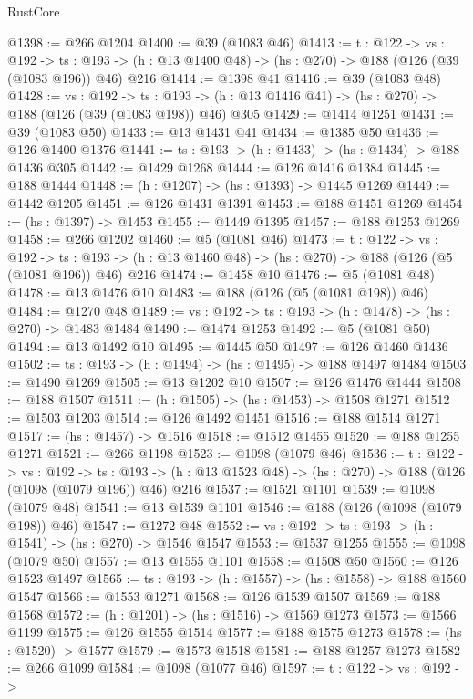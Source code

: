 \begin{lexlean}{RustCore}
\begin{coremodule}
@1398 := @266 @1204
@1400 := @39 (@1083 @46)
@1413 := {t : @122} ->
  {vs : @192} ->
  {ts : @193} -> (h : @13 @1400 @48) -> (hs : @270) -> @188 (@126 (@39 (@1083 @196)) @46) @216
@1414 := @1398 @41
@1416 := @39 (@1083 @48)
@1428 := {vs : @192} ->
  {ts : @193} -> (h : @13 @1416 @41) -> (hs : @270) -> @188 (@126 (@39 (@1083 @198)) @46) @305
@1429 := @1414 @1251
@1431 := @39 (@1083 @50)
@1433 := @13 @1431 @41
@1434 := @1385 @50
@1436 := @126 @1400 @1376
@1441 := {ts : @193} -> (h : @1433) -> (hs : @1434) -> @188 @1436 @305
@1442 := @1429 @1268
@1444 := @126 @1416 @1384
@1445 := @188 @1444
@1448 := (h : @1207) -> (hs : @1393) -> @1445 @1269
@1449 := @1442 @1205
@1451 := @126 @1431 @1391
@1453 := @188 @1451 @1269
@1454 := (hs : @1397) -> @1453
@1455 := @1449 @1395
@1457 := @188 @1253 @1269
@1458 := @266 @1202
@1460 := @5 (@1081 @46)
@1473 := {t : @122} ->
  {vs : @192} ->
  {ts : @193} -> (h : @13 @1460 @48) -> (hs : @270) -> @188 (@126 (@5 (@1081 @196)) @46) @216
@1474 := @1458 @10
@1476 := @5 (@1081 @48)
@1478 := @13 @1476 @10
@1483 := @188 (@126 (@5 (@1081 @198)) @46)
@1484 := @1270 @48
@1489 := {vs : @192} -> {ts : @193} -> (h : @1478) -> (hs : @270) -> @1483 @1484
@1490 := @1474 @1253
@1492 := @5 (@1081 @50)
@1494 := @13 @1492 @10
@1495 := @1445 @50
@1497 := @126 @1460 @1436
@1502 := {ts : @193} -> (h : @1494) -> (hs : @1495) -> @188 @1497 @1484
@1503 := @1490 @1269
@1505 := @13 @1202 @10
@1507 := @126 @1476 @1444
@1508 := @188 @1507
@1511 := (h : @1505) -> (hs : @1453) -> @1508 @1271
@1512 := @1503 @1203
@1514 := @126 @1492 @1451
@1516 := @188 @1514 @1271
@1517 := (hs : @1457) -> @1516
@1518 := @1512 @1455
@1520 := @188 @1255 @1271
@1521 := @266 @1198
@1523 := @1098 (@1079 @46)
@1536 := {t : @122} ->
  {vs : @192} ->
  {ts : @193} -> (h : @13 @1523 @48) -> (hs : @270) -> @188 (@126 (@1098 (@1079 @196)) @46) @216
@1537 := @1521 @1101
@1539 := @1098 (@1079 @48)
@1541 := @13 @1539 @1101
@1546 := @188 (@126 (@1098 (@1079 @198)) @46)
@1547 := @1272 @48
@1552 := {vs : @192} -> {ts : @193} -> (h : @1541) -> (hs : @270) -> @1546 @1547
@1553 := @1537 @1255
@1555 := @1098 (@1079 @50)
@1557 := @13 @1555 @1101
@1558 := @1508 @50
@1560 := @126 @1523 @1497
@1565 := {ts : @193} -> (h : @1557) -> (hs : @1558) -> @188 @1560 @1547
@1566 := @1553 @1271
@1568 := @126 @1539 @1507
@1569 := @188 @1568
@1572 := (h : @1201) -> (hs : @1516) -> @1569 @1273
@1573 := @1566 @1199
@1575 := @126 @1555 @1514
@1577 := @188 @1575 @1273
@1578 := (hs : @1520) -> @1577
@1579 := @1573 @1518
@1581 := @188 @1257 @1273
@1582 := @266 @1099
@1584 := @1098 (@1077 @46)
@1597 := {t : @122} ->
  {vs : @192} ->

\end{coremodule}
\end{lexlean}
